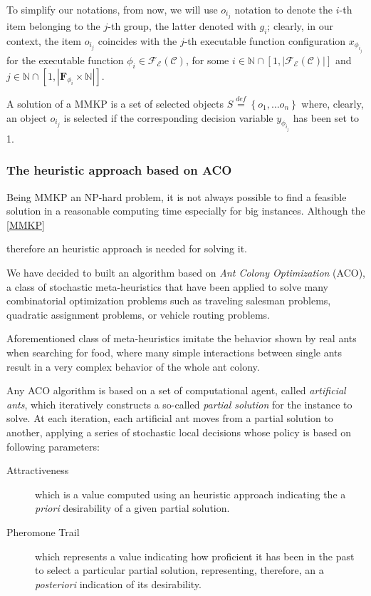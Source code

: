 \documentclass[12pt,a4paper]{report}
\newcommand{\mathDef}{\overset{\textit{def}}{=}}
\newcommand{\N}{\mathbb{N}}
\begin{document}
To simplify our notations, from now, we will use $o_{i_j}$ notation to denote the $i$-th item belonging to the $j$-th group, the latter denoted with $g_i$; clearly, in our context, the item $o_{i_j}$ coincides with the $j$-th executable function configuration $x_{\phi_{i_j}}$ for the executable function $\phi_i \in \mathscr{F_E}(\mathcal{C})$, for some $i \in \N \cap [1,|\mathscr{F_E}(\mathcal{C})|]$ and $j \in \N \cap [1,|\textbf{F}_{\phi_{i}} \times \N|]$. 

A solution of a MMKP is a set of selected objects $S \mathDef \left\{o_{1}, \ldots o_{n} \right\}$ where, clearly, an object $o_{i_j}$ is selected if the corresponding decision variable $y_{\phi_{i_j}}$ has been set to 1.


\subsubsection{The heuristic approach based on ACO}

Being MMKP an NP-hard problem, it is not always possible to find a feasible solution in a reasonable computing time especially for big instances. Although the \ref{MMKP}


 therefore an heuristic approach is needed for solving it. 

We have decided to built an algorithm based on \textit{Ant Colony Optimization} (ACO), a class of stochastic meta-heuristics that have been applied to solve many combinatorial optimization problems such as traveling salesman problems, quadratic assignment problems, or vehicle routing problems. 

Aforementioned class of meta-heuristics imitate the behavior shown by real ants when searching for food, where many simple interactions between single ants result in a very complex behavior of the whole ant colony.

Any ACO algorithm is based on a set of computational agent, called \textit{artificial ants}, which iteratively constructs a so-called  \textit{partial solution} for the instance to solve. At each iteration, each artificial ant moves from a partial solution to another, applying a series of stochastic local decisions whose policy is based on following parameters:

\begin{description}
	\item[Attractiveness] which is a value computed using an heuristic approach indicating the a \textit{priori} desirability of a given partial solution.
	
	\item[Pheromone Trail] which represents a value indicating how proficient it has been in the past to select a particular partial solution, representing, therefore, an a \textit{posteriori} indication of its desirability.
\end{description} 
\end{document}
